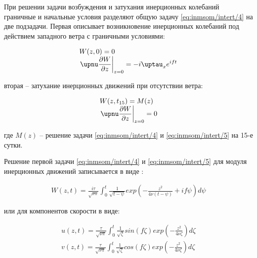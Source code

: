 При решении задачи возбуждения и затухания инерционных колебаний граничные и начальные условия разделяют общую задачу \ref{eq:inmsom/intert/4} на две подзадачи.
Первая описывает возникновение инерционных колебаний под действием западного ветра с граничными условиями:

\begin{equation} \label{eq:inmsom/intert/5}
  \begin{array}{l}
  W(z, 0) = 0 \\
  \displaystyle{ \left. \nu \d{W}{z} \right|_{z=0} = -i\tau_x e^{ift} } \\
  \end{array}
\end{equation}

вторая – затухание инерционных движений при отсутствии ветра:

\begin{equation} \label{eq:inmsom/intert/6}
  \begin{array}{l}
  W(z, t_{15}) = M(z) \\
  \displaystyle{ \left. \nu \d{W}{z} \right|_{z=0} = 0 } \\
  \end{array}
\end{equation}

где $M(z)$ – решение задачи \ref{eq:inmsom/intert/4} и \ref{eq:inmsom/intert/5} на 15-е сутки.

Решение первой задачи \ref{eq:inmsom/intert/4} и \ref{eq:inmsom/intert/5} для модуля инерционных движений записывается в виде \cite{InertOscKorotaev}:

\begin{equation} \label{eq:inmsom/intert/7}
  \begin{array}{l}
  W(z,t) = \frac{i \tau}{\sqrt{\nu \pi}} \int_0^t \frac{1}{\sqrt{t-\psi}} exp \left( -\frac{z^2}{4\nu (t - \psi)} + if\psi \right) d\psi
  \end{array}
\end{equation}

или для компонентов скорости в виде:

\begin{equation} \label{eq:inmsom/intert/8}
  \begin{array}{l}
    \displaystyle{ u(z, t) = \frac{\tau}{\sqrt{\nu \pi}} \int_0^t \frac{1}{\sqrt{\zeta}} sin(f\zeta) exp \left( -\frac{z^2}{4\nu \zeta} \right) d\zeta } \\
    \displaystyle{ v(z, t) = \frac{\tau}{\sqrt{\nu \pi}} \int_0^t \frac{1}{\sqrt{\zeta}} cos(f\zeta) exp \left( -\frac{z^2}{4\nu \zeta} \right) d\zeta } \\
  \end{array}
\end{equation}

